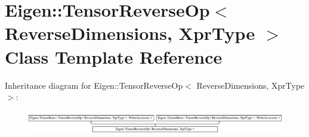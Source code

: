 \hypertarget{class_eigen_1_1_tensor_reverse_op}{}\section{Eigen\+:\+:Tensor\+Reverse\+Op$<$ Reverse\+Dimensions, Xpr\+Type $>$ Class Template Reference}
\label{class_eigen_1_1_tensor_reverse_op}
Inheritance diagram for Eigen\+:\+:Tensor\+Reverse\+Op$<$ Reverse\+Dimensions, Xpr\+Type $>$\+:\begin{figure}[H]
\begin{center}
\leavevmode
\includegraphics[height=1.031308cm]{class_eigen_1_1_tensor_reverse_op}
\end{center}
\end{figure}
